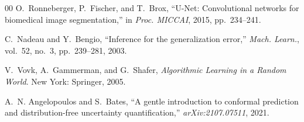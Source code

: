 \documentclass[preprint,12pt]{elsarticle}
\begin{document}
\begin{thebibliography}{00}
O.~Ronneberger, P.~Fischer, and T.~Brox, ``U-Net: Convolutional networks for biomedical image segmentation,'' in \textit{Proc. MICCAI}, 2015, pp.~234--241.

C.~Nadeau and Y.~Bengio, ``Inference for the generalization error,'' \textit{Mach. Learn.}, vol.~52, no.~3, pp.~239--281, 2003.

V.~Vovk, A.~Gammerman, and G.~Shafer, \textit{Algorithmic Learning in a Random World}. New York: Springer, 2005.

A.~N. Angelopoulos and S.~Bates, ``A gentle introduction to conformal prediction and distribution-free uncertainty quantification,'' \textit{arXiv:2107.07511}, 2021.

\end{thebibliography}
\end{document}
